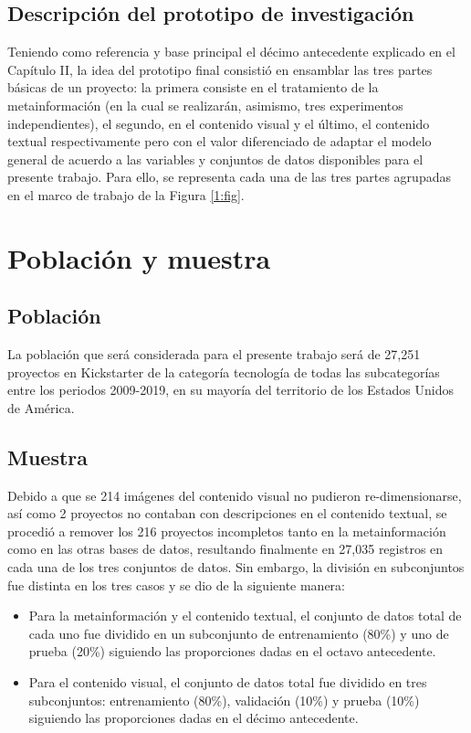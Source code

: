 \subsection{Descripción del prototipo de investigación}
Teniendo como referencia y base principal el décimo antecedente explicado en el Capítulo II, la idea del prototipo final consistió en ensamblar las tres partes básicas de un proyecto: la primera consiste en el tratamiento de la metainformación (en la cual se realizarán, asimismo, tres experimentos independientes), el segundo, en el contenido visual y el último, el contenido textual respectivamente pero con el valor diferenciado de adaptar el modelo general de acuerdo a las variables y conjuntos de datos disponibles para el presente trabajo. Para ello, se representa cada una de las tres partes agrupadas en el marco de trabajo de la Figura \ref{1:fig}.


\section{Población y muestra}

\subsection{Población}
La población que será considerada para el presente trabajo será de 27,251 proyectos en Kickstarter de la categoría tecnología de todas las subcategorías entre los periodos 2009-2019, en su mayoría del territorio de los Estados Unidos de América.

\subsection{Muestra}
Debido a que se 214 imágenes del contenido visual no pudieron re-dimensionarse, así como 2 proyectos no contaban con descripciones en el contenido textual, se procedió a remover los 216 proyectos incompletos tanto en la metainformación como en las otras bases de datos, resultando finalmente en 27,035 registros en cada una de los tres conjuntos de datos. Sin embargo, la división en subconjuntos fue distinta en los tres casos y se dio de la siguiente manera:

\begin{itemize}
	\item Para la metainformación y el contenido textual, el conjunto de datos total de cada uno fue dividido en un subconjunto de entrenamiento (80\%) y uno de prueba (20\%) siguiendo las proporciones dadas en el octavo antecedente.
	\item Para el contenido visual, el conjunto de datos total fue dividido en tres subconjuntos: entrenamiento (80\%), validación (10\%) y prueba (10\%) siguiendo las proporciones dadas en el décimo antecedente.
\end{itemize}

